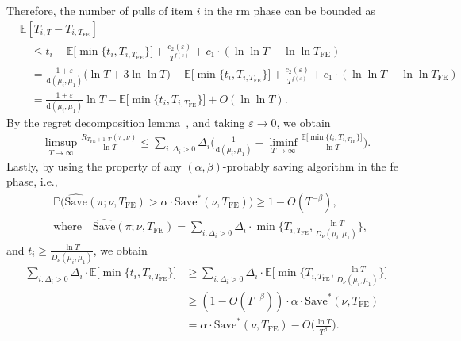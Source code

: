 \documentclass[twoside,11pt]{article}
\newcommand{\rmd}{\mathrm{d}}
\newcommand{\bbE}{\mathbb{E}}
\newcommand{\bbP}{\mathbb{P}}
\newcommand{\Tfe}{T_{\mathrm{FE}}}
\newcommand{\Saved}{\mathrm{Save}}
\newcommand{\klnu}{D_{\nu}}
\begin{document}
Therefore, the number of pulls of item $i$ in the \ac{rm} phase can be bounded as
\begin{align}
    &\bbE[T_{i,T}-T_{i,\Tfe}]
    \\
    &\quad\leq  
        t_i-
        \bbE\Big[\min\{t_i,T_{i,\Tfe}\} \Big] + \frac{c_2(\varepsilon)}{T^{f(\varepsilon)}}
        +
        c_1 \cdot ( \ln\ln T -  \ln\ln \Tfe)
    \\
    &\quad =
        \frac{1+\varepsilon}{\rmd(\mu_i,\mu_1)} \Big(\ln T + 3\ln\ln T \Big) - \bbE\Big[\min\{t_i,T_{i,\Tfe}\} \Big] 
           + \frac{c_2(\varepsilon)}{T^{f(\varepsilon)}}
            +
            c_1 \cdot ( \ln\ln T -  \ln\ln \Tfe)
    \\
    &\quad =
    \frac{1+\varepsilon}{\rmd(\mu_i,\mu_1)} \ln T  - \bbE\Big[\min\{t_i,T_{i,\Tfe}\} \Big]  + O( \ln\ln T ).
\end{align}
By the regret decomposition lemma~\citep[Lemma 4.5]{lattimore2020bandit},  and taking $\varepsilon\to0$, we obtain
\begin{align}
    \limsup_{T\to\infty}  \frac{R_{\Tfe+1:T} (\pi;\nu )}{\ln T}\le\sum_{i:\Delta_i>0} 
          \Delta_{i}
             \Big(
               \frac{1}{\rmd(\mu_i,\mu_1)}
               -
                \liminf_{T\to\infty}\frac{\bbE\big[\min\{t_i,T_{i,\Tfe}\} \big]}{\ln T}
             \Big).
\end{align}
Lastly, by using the property of any $(\alpha,\beta)$-probably saving algorithm in the \ac{fe} phase, i.e.,
\begin{align}
        &\bbP\Big(
            \widehat{\Saved}(\pi;\nu,\Tfe)>\alpha\cdot \Saved^*(\nu,\Tfe)
        \Big)
        \geq
        1 - O(T^{-\beta}),
        \\
        &\mbox{where}\quad
        \widehat{\Saved}(\pi;\nu,\Tfe) = 
    \sum_{i:\Delta_{i}>0} \Delta_{i}\cdot \min\bigg\{ T_{i,\Tfe},\frac{\ln T}{\klnu(\mu_i,\mu_1)}\bigg\},
\end{align}
and $t_i\geq \frac{\ln T}{\klnu(\mu_i,\mu_1)}$,
we obtain 
\begin{align}
    \sum_{i:\Delta_i>0} \Delta_i\cdot \bbE\Big[\min\{t_i,T_{i,\Tfe}\} \Big]
    &\geq
    \sum_{i:\Delta_{i}>0} \Delta_{i}\cdot \bbE\bigg[\min\bigg\{ T_{i,\Tfe},\frac{\ln T}{\klnu(\mu_i,\mu_1)}\bigg\}\bigg]
    \\
    &
    \geq (1- O(T^{-\beta})) \cdot \alpha\cdot \Saved^*(\nu,\Tfe)
    \\
    &= \alpha\cdot \Saved^*(\nu,\Tfe) - O\bigg(\frac{\ln T}{T^{\beta}}\bigg).
\end{align}
\end{document}
